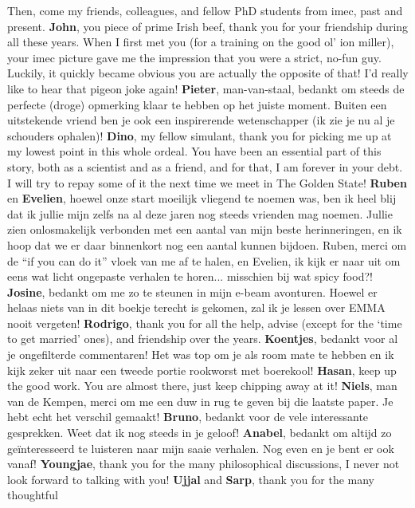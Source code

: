Then, come my friends, colleagues, and fellow PhD students from imec, past and present. \textbf{John}, you
piece of prime Irish beef, thank you for your friendship during all these years. When I first met you (for a
training on the good ol' ion miller), your imec picture gave me the impression that you were a strict, no-fun
guy. Luckily, it quickly became obvious you are actually the opposite of that! I'd really like to hear that
pigeon joke again! \textbf{Pieter}, man-van-staal, bedankt om steeds de perfecte (droge) opmerking klaar te
hebben op het juiste moment. Buiten een uitstekende vriend ben je ook een inspirerende wetenschapper (ik zie
je nu al je schouders ophalen)! \textbf{Dino}, my fellow simulant, thank you for picking me up at my lowest
point in this whole ordeal. You have been an essential part of this story, both as a scientist and as a
friend, and for that, I am forever in your debt. I will try to repay some of it the next time we meet in The
Golden State! \textbf{Ruben} en \textbf{Evelien}, hoewel onze start moeilijk vliegend te noemen was, ben ik
heel blij dat ik jullie mijn zelfs na al deze jaren nog steeds vrienden mag noemen. Jullie zien onlosmakelijk
verbonden met een aantal van mijn beste herinneringen, en ik hoop dat we er daar binnenkort nog een aantal
kunnen bijdoen. Ruben, merci om de ``if you can do it'' vloek van me af te halen, en Evelien, ik kijk er naar
uit om eens wat licht ongepaste verhalen te horen... misschien bij wat spicy food?! \textbf{Josine}, bedankt
om me zo te steunen in mijn e-beam avonturen. Hoewel er helaas niets van in dit boekje terecht is gekomen, zal
ik je lessen over EMMA nooit vergeten! \textbf{Rodrigo}, thank you for all the help, advise (except for the
`time to get married' ones), and friendship over the years. \textbf{Koentjes}, bedankt voor al je ongefilterde
commentaren! Het was top om je als room mate te hebben en ik kijk zeker uit naar een tweede portie rookworst
met boerekool! \textbf{Hasan}, keep up the good work. You are almost there, just keep chipping away at it!
\textbf{Niels}, man van de Kempen, merci om me een duw in rug te geven bij die laatste paper. Je hebt echt het
verschil gemaakt! \textbf{Bruno}, bedankt voor de vele interessante gesprekken. Weet dat ik nog steeds in je
geloof! \textbf{Anabel}, bedankt om altijd zo ge\"{i}nteresseerd te luisteren naar mijn saaie verhalen. Nog
even en je bent er ook vanaf! \textbf{Youngjae}, thank you for the many philosophical discussions, I never not
look forward to talking with you! \textbf{Ujjal} and \textbf{Sarp}, thank you for the many thoughtful
